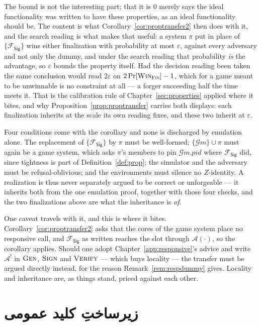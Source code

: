 \documentclass[10pt,oneside,openany]{book}
\newcommand{\PID}{\mathit{pid}}
\newcommand{\Adv}{\mathcal{A}}
\newcommand{\op}[1]{\textnormal{\textsc{#1}}}
\newcommand{\Gm}{\mathcal{G}m}
\newcommand{\Win}{\op{Win}}
\newcommand{\Fsig}{\mathcal{F}_{\mathsf{Sig}}}
\theoremstyle{accentdef}
\theoremstyle{accentplain}
\begin{document}
The bound is not the interesting part; that it is $0$ merely says the ideal functionality was written
to have these properties, as an ideal functionality should be. The content is what
Corollary~\ref{cor:proptransfer2} then does with it, and the search reading is what makes that
useful: a system $\pi$ put in place of $\{\Fsig\}$ wins either finalization with probability at most
$\varepsilon$, against every adversary and not only the dummy, and under the search reading that
probability \emph{is} the advantage, so $\varepsilon$ bounds the property itself. Had the decision
reading been taken the same conclusion would read $2\varepsilon$ on $2\Pr[\Win_{\op{Fin}}]-1$, which
for a game meant to be unwinnable is no constraint at all --- a forger
succeeding half the time meets it. That is the calibration rule of Chapter~\ref{sec:properties}
applied where it bites, and why Proposition~\ref{prop:proptransfer} carries both displays: each
finalization inherits at the scale its own reading fixes, and these two inherit at $\varepsilon$.

Four conditions come with the corollary and none is discharged by emulation alone. The replacement of
$\{\Fsig\}$ by $\pi$ must be well-formed; $\{\Gm\} \cup \pi$ must again be a game system, which asks
$\pi$'s members to pin $\Gm.\PID$ where $\Fsig$ did, since tightness is part of
Definition~\ref{def:prop}; the simulator and the adversary must be refusal-oblivious; and the
environments must silence no $Z$-identity. A realization is thus never separately argued to be correct
or unforgeable --- it inherits both from the one emulation proof, together with those four checks, and
the two finalizations above are what the inheritance is \emph{of}.

One caveat travels with it, and this is where it bites. Corollary~\ref{cor:proptransfer2} asks that
the cores of the game system place no responsive call, and $\Fsig$ as written reaches the slot through
$\Adv(\cdot)$, so the corollary applies. Should one adopt Chapter~\ref{app:responsive}'s advice and
write $\Adv^{!}$ in $\op{Gen}$, $\op{Sign}$ and $\op{Verify}$ --- which buys locality --- the transfer
must be argued directly instead, for the reason Remark~\ref{rem:respdummy} gives. Locality and
inheritance are, as things stand, priced against each other.

\chapter{زیرساختِ کلید عمومی}\label{sec:pki}
\end{document}
